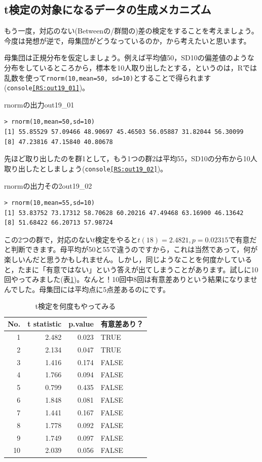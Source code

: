 \documentclass{ltjsarticle}
\begin{document}
\subsection{t検定の対象になるデータの生成メカニズム}
もう一度，対応のない(Betweenの/群間の)差の検定をすることを考えましょう。今度は発想が逆で，母集団がどうなっているのか，から考えたいと思います。

母集団は正規分布を仮定しましょう。例えば平均値50，SD10の偏差値のような分布をしているところから，標本を10人取り出したとする，というのは，Rでは乱数を使って\texttt{rnorm(10,mean=50, sd=10)}とすることで得られます(\texttt{console\ref{RS:out19_01}})。

\begin{Rscreen}{rnormの出力}{out19_01}
    \begin{verbatim}
> rnorm(10,mean=50,sd=10)
[1] 55.85529 57.09466 48.90697 45.46503 56.05887 31.82044 56.30099 
[8] 47.23816 47.15840 40.80678
\end{verbatim}
\end{Rscreen}

先ほど取り出したのを群1として，もう1つの群2は平均55，SD10の分布から10人取り出したとしましょう(\texttt{console\ref{RS:out19_02}})。

\begin{Rscreen}{rnormの出力その2}{out19_02}
    \begin{verbatim}
> rnorm(10,mean=55,sd=10)
[1] 53.83752 73.17312 58.70628 60.20216 47.49468 63.16900 46.13642 
[8] 51.68422 66.20713 57.98724
\end{verbatim}
\end{Rscreen}

この2つの群で，対応のない$t$検定をやると$t(18)=2.4821,p=0.02315$で有意だと判断できます。母平均が50と55で違うのですから，これは当然であって，何が楽しいんだと思うかもしれません。しかし，同じようなことを何度かしていると，たまに「有意ではない」という答えが出てしまうことがあります。試しに10回やってみました(表\ref{tbl::19_03})。なんと！10回中8回は有意差ありという結果になりませんでした。母集団には平均点に5点差あるのにです。

\begin{table}[ht]
    \centering
    \caption{t検定を何度もやってみる} 
    \begin{tabular}{rrrl}
      \hline
  No.   & t statistic & p.value & 有意差あり？ \\ 
      \hline
    1 & 2.482 & 0.023 & TRUE \\ 
      2 & 2.134 & 0.047 & TRUE \\ 
      3 & 1.416 & 0.174 & FALSE \\ 
      4 & 1.766 & 0.094 & FALSE \\ 
      5 & 0.799 & 0.435 & FALSE \\ 
      6 & 1.848 & 0.081 & FALSE \\ 
      7 & 1.441 & 0.167 & FALSE \\ 
      8 & 1.778 & 0.092 & FALSE \\ 
      9 & 1.749 & 0.097 & FALSE \\ 
      10 & 2.039 & 0.056 & FALSE \\ 
       \hline
    \end{tabular}
    \label{tbl::19_03}
\end{table}
\end{document}
